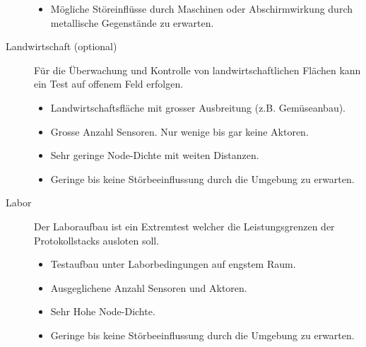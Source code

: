 \begin{description}
\begin{itemize}
		\item Mögliche Störeinflüsse durch Maschinen oder Abschirmwirkung durch 			metallische Gegenstände zu erwarten. \hfill \\
	\end{itemize}
\item[Landwirtschaft (optional)] Für die Überwachung und Kontrolle von landwirtschaftlichen Flächen kann ein Test auf offenem Feld erfolgen.
	\begin{itemize}
		\item Landwirtschaftsfläche mit grosser Ausbreitung (z.B. Gemüseanbau).
		\item Grosse Anzahl Sensoren. Nur wenige bis gar keine Aktoren.
		\item Sehr geringe Node-Dichte mit weiten Distanzen.
		\item Geringe bis keine Störbeeinflussung durch die Umgebung zu erwarten. \hfill \\
	\end{itemize}
\item[Labor] Der Laboraufbau ist ein Extremtest welcher die Leistungsgrenzen der Protokollstacks ausloten soll.
	\begin{itemize}
		\item Testaufbau unter Laborbedingungen auf engstem Raum.
		\item Ausgeglichene Anzahl Sensoren und Aktoren.
		\item Sehr Hohe Node-Dichte.
		\item Geringe bis keine Störbeeinflussung durch die Umgebung zu erwarten. \hfill \\
	\end{itemize} 
\end{description}







